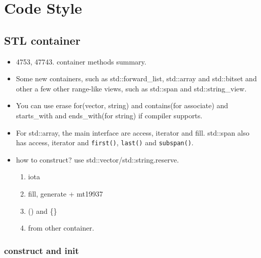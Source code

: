 \documentclass[a4paper,11pt,twoside]{book}
\begin{document}
\section{Code Style}

\subsection{STL container}
\begin{itemize}
	\item 4753, 47743. container methods summary.
	
	\item Some new containers, such as std::forward\_list, std::array and std::bitset and other a few other range-like views, such as std::span and std::string\_view.
	
	\item You can use erase for(vector, string) and contains(for associate) and starts\_with and ends\_with(for string) if compiler supports. 
	
	\item For std::array, the main interface are access, iterator and fill. std::span also has access, iterator and \texttt{first()}, \texttt{last()} and \texttt{subspan()}.
	
	\item how to construct? use std::vector/std::string.reserve. 
\begin{enumerate}
	\item iota
	\item fill, generate + mt19937
	\item () and \{\}
	\item from other container. 
\end{enumerate}
		
\end{itemize}

\subsubsection{construct and init}
\end{document}
